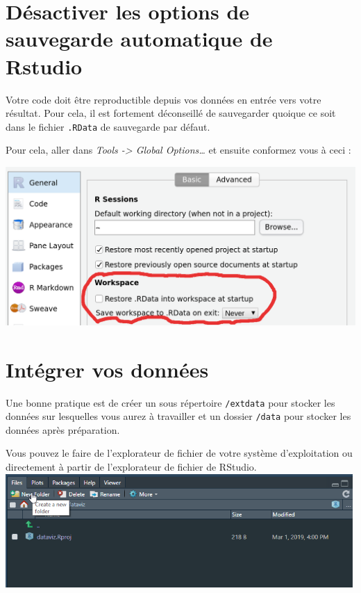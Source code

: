 \documentclass[
]{book}
\begin{document}
\hypertarget{duxe9sactiver-les-options-de-sauvegarde-automatique-de-rstudio}{%
\section{Désactiver les options de sauvegarde automatique de Rstudio}\label{duxe9sactiver-les-options-de-sauvegarde-automatique-de-rstudio}}

Votre code doit être reproductible depuis vos données en entrée vers votre résultat. Pour cela, il est fortement déconseillé de sauvegarder quoique ce soit dans le fichier \texttt{.RData} de sauvegarde par défaut.

Pour cela, aller dans \emph{Tools -\textgreater{} Global Options\ldots{}} et ensuite conformez vous à ceci :

\includegraphics{pic/RData.png}

\hypertarget{intuxe9grer-vos-donnuxe9es}{%
\section{Intégrer vos données}\label{intuxe9grer-vos-donnuxe9es}}

Une bonne pratique est de créer un sous répertoire \texttt{/extdata} pour stocker les données sur lesquelles vous aurez à travailler et un dossier \texttt{/data} pour stocker les données après préparation.

Vous pouvez le faire de l'explorateur de fichier de votre système d'exploitation ou directement à partir de l'explorateur de fichier de RStudio.
\includegraphics[width=5.20833in,height=\textheight]{pic/creerprojet3.png}
\end{document}
